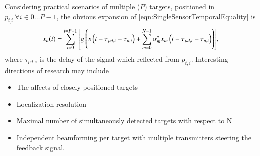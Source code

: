 Considering practical scenarios of multiple ($P$) targets, positioned in $p_{t_,i}\ \forall i\in0\dots{}P-1$, the obvious expansion of \eqref{eqn:SingleSensorTemporalEquality} is 
\begin{equation}
    \label{eqn:ftr_dyn_temp}
    x_{n}(t) = \sum_{i=0}^{i=P-1}{\left[{g\left({s\left({t-\tau_{pd,i}-\tau_{n,i}}\right)
    +\sum_{m=0}^{N-1}{\alpha^{*}_{m}x_{m}\left({t-\tau_{pd,i}-\tau_{n,i}}\right)}}\right)}\right]},
\end{equation}
where $\tau_{pd,i}$ is the delay of the signal which reflected from $p_{t,i}$.
Interesting directions of research may include
\begin{itemize}
    \item The affects of closely positioned targets
    \item Localization resolution
    \item Maximal number of simultaneously detected targets with respect to N
    \item Independent beamforming per target with multiple transmitters steering the feedback signal. 
\end{itemize}